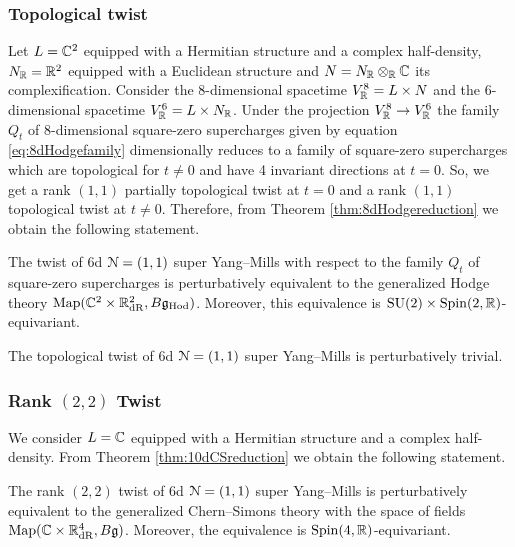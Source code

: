 \documentclass[10pt, oneside]{article}
\newcommand{\Hod}{\mathrm{Hod}}
\begin{document}
\subsubsection{Topological twist}
\label{sect:6d11topologicaltwist}

Let $L=\mathbb C^2$ equipped with a Hermitian structure and a complex half-density, $N_\mathbb R=\mathbb R^2$ equipped with a Euclidean structure and $N=N_\mathbb R\otimes_\mathbb R\mathbb C$ its complexification. Consider the 8-dimensional spacetime $V^8_\mathbb R=L\times N$ and the 6-dimensional spacetime $V^6_\mathbb R=L\times N_\mathbb R$. Under the projection $V^8_\mathbb R\rightarrow V^6_\mathbb R$ the family $Q_t$ of 8-dimensional square-zero supercharges given by equation \eqref{eq:8dHodgefamily} dimensionally reduces to a family of square-zero supercharges which are topological for $t\neq 0$ and have 4 invariant directions at $t=0$. So, we get a rank $(1, 1)$ partially topological twist at $t=0$ and a rank $(1, 1)$ topological twist at $t\neq 0$. Therefore, from Theorem \ref{thm:8dHodgereduction} we obtain the following statement.

\begin{theorem}
The twist of 6d $\mathcal N=(1, 1)$ super Yang--Mills with respect to the family $Q_t$ of square-zero supercharges is perturbatively equivalent to the generalized Hodge theory $\map(\CC^2\times \RR^2_{\mathrm{dR}}, B\fg_{\Hod})$. Moreover, this equivalence is $\mathrm{SU}(2)\times \mathrm{Spin}(2, \mathbb R)$-equivariant.
\label{thm:6dHodgetwist}
\end{theorem}

\begin{corollary}
The topological twist of 6d $\mathcal N=(1, 1)$ super Yang--Mills is perturbatively trivial.
\end{corollary}

\subsubsection{Rank \texorpdfstring{$(2, 2)$}{(2,2)} Twist}
\label{sect:6drank22twist}

We consider $L=\mathbb C$ equipped with a Hermitian structure and a complex half-density. From Theorem \ref{thm:10dCSreduction} we obtain the following statement.

\begin{theorem}
The rank $(2, 2)$ twist of 6d $\mathcal N=(1, 1)$ super Yang--Mills is perturbatively equivalent to the generalized Chern--Simons theory with the space of fields $\operatorname{Map}(\mathbb C\times \mathbb R^4_{\mathrm{dR}}, B\mathfrak g)$. Moreover, the equivalence is $\mathrm{Spin}(4, \mathbb R)$-equivariant.
\label{thm:6drank22}
\end{theorem}
\end{document}
